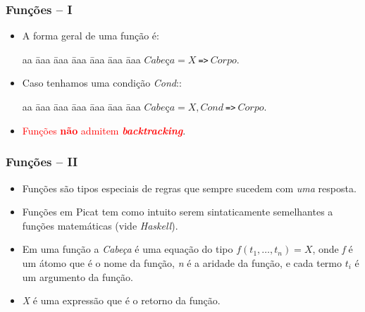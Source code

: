 \begin{frame}[fragile]
	\frametitle{Funções -- I}
    
    \begin{itemize}
        \item A forma geral de uma função é:
        
        \begin{tabbing}
          aa \= aaa \= aaa \= aaa \= aaa \= aaa \= aaa \kill
          \> \> $Cabe$ç$a = X \ $\verb+=>+$\ Corpo$. 
        \end{tabbing}

       \pause        
        \item Caso tenhamos uma condição \emph{Cond}::
        
        \begin{tabbing}
          aa \= aaa \= aaa \= aaa \= aaa \= aaa \= aaa \kill
          \> \> $Cabe$ç$a = X , Cond \ $\verb+=>+$\ Corpo$. 
        \end{tabbing}
        
        \item \textcolor{red}{Funções \textbf{não} admitem \textbf{\textit{backtracking}}}.
    \end{itemize}
\end{frame}
    
\begin{frame}[fragile]
	\frametitle{Funções -- II}

    
    \begin{itemize}
        \item Funções são tipos especiais de regras que sempre sucedem com \emph{uma} 
        resposta.
        
        \pause
        \item Funções em Picat tem como intuito serem sintaticamente semelhantes a funções matemáticas (vide \emph{Haskell}).
        
        \pause
        \item Em uma função a \emph{Cabeça} é uma equação do tipo $f(t_1,\ldots,t_n)=X$, onde
        \emph{f} é um átomo que é o nome da função, \emph{n} é a aridade da função, e cada
        termo $t_i$ é um argumento da função.
        
        \item \emph{X} é uma expressão que é o retorno da função.
        
    \end{itemize}
    
\end{frame}
    
